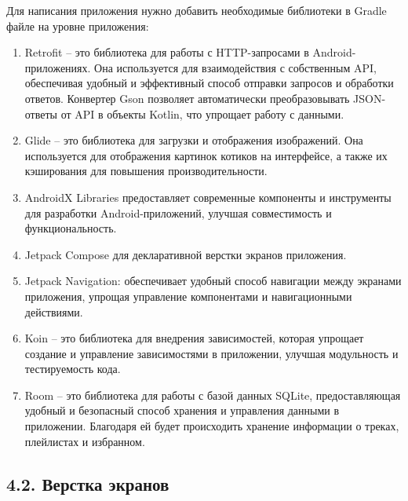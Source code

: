\documentclass{vsureport}
\begin{document}
Для написания приложения нужно добавить необходимые библиотеки в Gradle файле на уровне приложения: 
\begin{enumerate}
	\item Retrofit – это библиотека для работы с HTTP-запросами в Android-приложениях. Она используется для взаимодействия с собственным API, обеспечивая удобный и эффективный способ отправки запросов и обработки ответов. Конвертер Gson позволяет автоматически преобразовывать JSON-ответы от API в объекты Kotlin, что упрощает работу с данными.   \cite{ref7}\cite{ref8}
	
	\item Glide – это библиотека для загрузки и отображения изображений. Она используется для отображения картинок котиков на интерфейсе, а также их кэширования для повышения производительности. \cite{ref7}
	
	\item AndroidX Libraries предоставляет современные компоненты и инструменты для разработки Android-приложений, улучшая совместимость и функциональность. \cite{ref7}
	
	\item Jetpack Compose для декларативной верстки экранов приложения. \cite{ref7}
	
	\item Jetpack Navigation: обеспечивает удобный способ навигации между экранами приложения, упрощая управление компонентами и навигационными действиями. 
	
	\item Koin – это библиотека для внедрения зависимостей, которая упрощает создание и управление зависимостями в приложении, улучшая модульность и тестируемость кода.
	
	\item Room – это библиотека для работы с базой данных SQLite, предоставляющая удобный и безопасный способ хранения и управления данными в приложении. Благодаря ей будет происходить хранение информации о треках, плейлистах и избранном.
\end{enumerate}

\subsection*{4.2. Верстка экранов}
\end{document}

